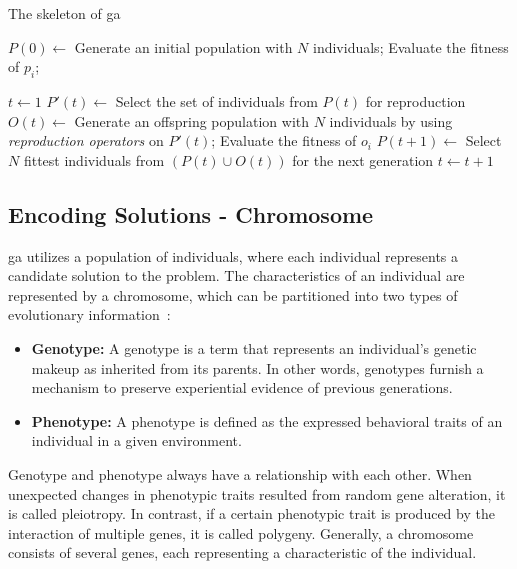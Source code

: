 \begin{algorithm}
	\caption{The skeleton of \gls{ga}}
	\label{alg:ga}
	\BlankLine
	\Begin
	{	
		$P(0) \leftarrow$ Generate an initial population with $N$ individuals; \;
		{
			Evaluate the fitness of $p_i$; \;
		} 
		
		$t \leftarrow 1$\;
		{
			$P'(t) \leftarrow$ Select the set of individuals from $P(t)$ for reproduction \;
			$O(t) \leftarrow$ Generate an offspring population with $N$ individuals by using \emph{reproduction operators} on $P'(t)$; \;
			{
				Evaluate the fitness of $o_i$\;
			} 
			$P(t+1) \leftarrow$ Select $N$ fittest individuals from $(P(t) \cup O(t))$ for the next generation\;
			$t \leftarrow t + 1$\;
		}
	}
\end{algorithm}

\subsection {Encoding Solutions - Chromosome}
\label{ga:encoding}
\gls{ga} utilizes a population of individuals, where each individual represents a candidate solution to the problem. The characteristics of an individual are represented by a chromosome, which can be partitioned into two types of evolutionary information~\cite{engelbrecht2007computational}: 
\begin{itemize}
	\item \textbf{Genotype:} A genotype is a term that represents an individual's genetic makeup as inherited from its parents. In other words, genotypes furnish a mechanism to preserve experiential evidence of previous generations.
	\item \textbf{Phenotype:} A phenotype is defined as the expressed behavioral traits of an individual in a given environment.
\end{itemize}

Genotype and phenotype always have a relationship with each other. When unexpected changes in phenotypic traits resulted from random gene alteration, it is called pleiotropy. In contrast, if a certain phenotypic trait is produced by the interaction of multiple genes, it is called polygeny. Generally, a chromosome consists of several genes, each representing a characteristic of the individual.

